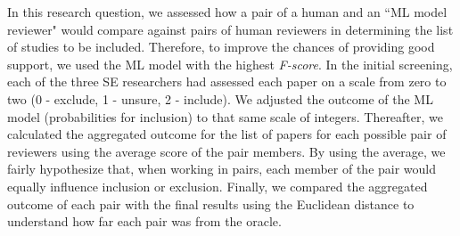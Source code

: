     In this research question, we assessed how a pair of a human and an ``ML model reviewer" would compare against pairs of human reviewers in determining the list of studies to be included. Therefore, to improve the chances of providing good support, we used the ML model with the highest \textit{F-score}. In the initial screening, each of the three SE researchers had assessed each paper on a scale from zero to two (0 - exclude, 1 - unsure, 2 - include). We adjusted the outcome of the ML model (probabilities for inclusion) to that same scale of integers. Thereafter, we calculated the aggregated outcome for the list of papers for each possible pair of reviewers using the average score of the pair members. By using the average, we fairly hypothesize that, when working in pairs, each member of the pair would equally influence inclusion or exclusion. Finally, we compared the aggregated outcome of each pair with the final results using the Euclidean distance to understand how far each pair was from the oracle.



